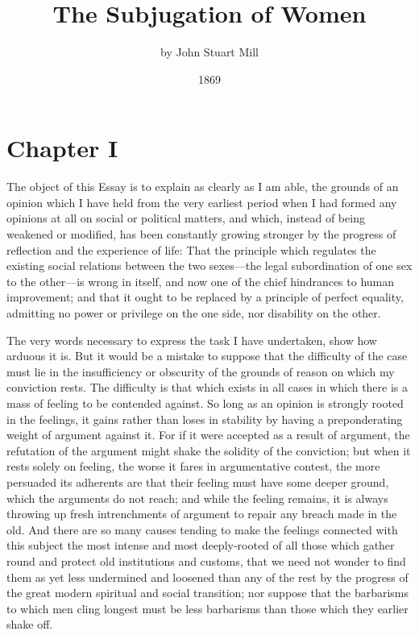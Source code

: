 \documentclass[12pt]{report}
\title{\HUGE\bfseries{The Subjugation of Women}}
\author{\Large by John Stuart Mill}
\date{\vspace{-4mm}1869}
\newcommand{\mychapter}[2]{
\setcounter{chapter}{#1}
    \setcounter{section}{0}
    \chapter*{#2}
    \addcontentsline{toc}{chapter}{#2}
}
\begin{document}
\begin{titlepage}
    \maketitle
\end{titlepage}

\renewcommand*\contentsname{Contents}
\tableofcontents


\titlespacing{\chapter}{0mm}{-2em}{1.5em}
\mychapter{1}{Chapter I}
The object of this Essay is to explain as clearly as I am able, the grounds of an opinion which I have held from the very earliest period when I had formed any opinions at all on social or political matters, and which, instead of being weakened or modified, has been constantly growing stronger by the progress of reflection and the experience of life: That the principle which regulates the existing social relations between the two sexes—the legal subordination of one sex to the other—is wrong in itself, and now one of the chief hindrances to human improvement; and that it ought to be replaced by a principle of perfect equality, admitting no power or privilege on the one side, nor disability on the other.

The very words necessary to express the task I have undertaken, show how arduous it is. But it would be a mistake to suppose that the difficulty of the case must lie in the insufficiency or obscurity of the grounds of reason on which my conviction rests. The difficulty is that which exists in all cases in which there is a mass of feeling to be contended against. So long as an opinion is strongly rooted in the feelings, it gains rather than loses in stability by having a preponderating weight of argument against it. For if it were accepted as a result of argument, the refutation of the argument might shake the solidity of the conviction; but when it rests solely on feeling, the worse it fares in argumentative contest, the more persuaded its adherents are that their feeling must have some deeper ground, which the arguments do not reach; and while the feeling remains, it is always throwing up fresh intrenchments of argument to repair any breach made in the old. And there are so many causes tending to make the feelings connected with this subject the most intense and most deeply-rooted of all those which gather round and protect old institutions and customs, that we need not wonder to find them as yet less undermined and loosened than any of the rest by the progress of the great modern spiritual and social transition; nor suppose that the barbarisms to which men cling longest must be less barbarisms than those which they earlier shake off.
\end{document}

